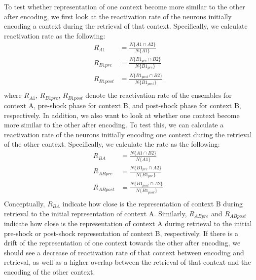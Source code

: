 \documentclass[master.tex]{subfiles}
\begin{document}
To test whether representation of one context become more similar to the other
after encoding, we first look at the reactivation rate of the neurons initially
encoding a context during the retrieval of that context. Specifically, we
calculate reactivation rate as the following:
\begin{align*}
  R_{A1} & = \frac{N\{A1 \cap A2\}}{N\{A1\}} \\
  R_{B1pre} & = \frac{N\{B1_{pre} \cap B2\}}{N\{B1_{pre}\}} \\
  R_{B1post} & = \frac{N\{B1_{post} \cap B2\}}{N\{B1_{post}\}} \\
\end{align*}
where $R_{A1}$, $R_{B1pre}$, $R_{B1post}$ denote the reactivation rate of the
ensembles for context A, pre-shock phase for context B, and post-shock phase for
context B, respectively. In addition, we also want to look at whether one
context become more similar to the other after encoding. To test this, we can
calculate a reactivation rate of the neurons initially encoding one context
during the retrieval of the other context. Specifically, we calculate the rate
as the following:
\begin{align*}
  R_{BA} & = \frac{N\{A1 \cap B2\}}{N\{A1\}} \\
  R_{ABpre} & = \frac{N\{B1_{pre} \cap A2\}}{N\{B1_{pre}\}} \\
  R_{ABpost} & = \frac{N\{B1_{post} \cap A2\}}{N\{B1_{post}\}} \\
\end{align*}
Conceptually, $R_{BA}$ indicate how close is the representation of context B
during retrieval to the initial representation of context A. Similarly,
$R_{ABpre}$ and $R_{ABpost}$indicate how close is the representation of context
A during retrieval to the initial pre-shock or post-shock representation of
context B, respectively. If there is a drift of the representation of one
context towards the other after encoding, we should see a decrease of
reactivation rate of that context between encoding and retrieval, as well as a
higher overlap between the retrieval of that context and the encoding of the
other context.
\end{document}
